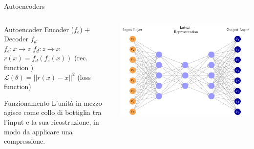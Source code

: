 \documentclass[11pt]{beamer}
\begin{document}
\begin{frame}{Autoencoders \cite{pml1Book,pml2Book}}
\begin{columns}
\begin{column}{0.5\textwidth}
\begin{alertblock}{Autoencoder}
Encoder ($f_{e}$) +   Decoder $f_{d}$ \\
$f_{e}: x \rightarrow z$ $f_{d}: z \rightarrow x$ \\ $ r(x)= f_{d}(f_{e}(x))$ (rec. function )\\$\mathcal{L}(\theta)=||r(x)-x||^{2}$ (loss function)
\end{alertblock}
\begin{alertblock}{Funzionamento}
L'unità in mezzo agisce come collo di bottiglia tra l'input e la sua ricostruzione, in modo da applicare una compressione.
\end{alertblock}
\end{column}
\begin{column}{0.4\textwidth}  
\begin{center}
\includegraphics[width=\textwidth]{Pic/autoencoder.png}
\end{center}
\end{column}
\end{columns}
\end{frame}
\end{document}

